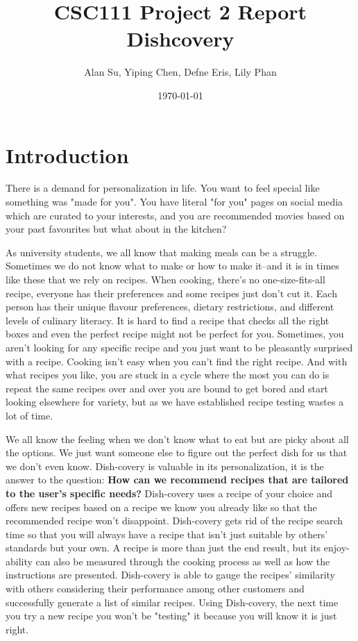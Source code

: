 \documentclass[fontsize=11pt]{article}
\title{CSC111 Project 2 Report Dishcovery}
\author{Alan Su, Yiping Chen, Defne Eris, Lily Phan}
\date{\today}
\begin{document}
\maketitle

\section{Introduction}
\par There is a demand for personalization in life. You want to feel special like something was "made for you". You have literal "for you" pages on social media which are curated to your interests, and you are recommended movies based on your past favourites but what about in the kitchen? \newline

\par As university students, we all know that making meals can be a struggle. Sometimes we do not know what to make or how to make it--and it is in times like these that we rely on recipes. When cooking, there's no one-size-fits-all recipe, everyone has their preferences and some recipes just don't cut it. Each person has their unique flavour preferences, dietary restrictions, and different levels of culinary literacy. It is hard to find a recipe that checks all the right boxes and even the perfect recipe might not be perfect for you. Sometimes, you aren't looking for any specific recipe and you just want to be pleasantly surprised with a recipe.  Cooking isn’t easy when you can’t find the right recipe. And with what recipes you like, you are stuck in a cycle where the most you can do is repeat the same recipes over and over you are bound to get bored and start looking elsewhere for variety, but as we have established recipe testing wastes a lot of time.\newline

\par We all know the feeling when we don't know what to eat but are picky about all the options. We just want someone else to figure out the perfect dish for us that we don't even know. Dish-covery is valuable in its personalization, it is the answer to the question: \textbf{How can we recommend recipes that are tailored to the user's specific needs?}  Dish-covery uses a recipe of your choice and offers new recipes based on a recipe we know you already like so that the recommended recipe won't disappoint. Dish-covery gets rid of the recipe search time so that you will always have a recipe that isn’t just suitable by others’ standards but your own. A recipe is more than just the end result, but its enjoy-ability can also be measured through the cooking process as well as how the instructions are presented. Dish-covery is able to gauge the recipes' similarity with others considering their performance among other customers and successfully generate a list of similar recipes. Using Dish-covery, the next time you try a new recipe you won't be "testing" it because you will know it is just right. \newline
\end{document}
